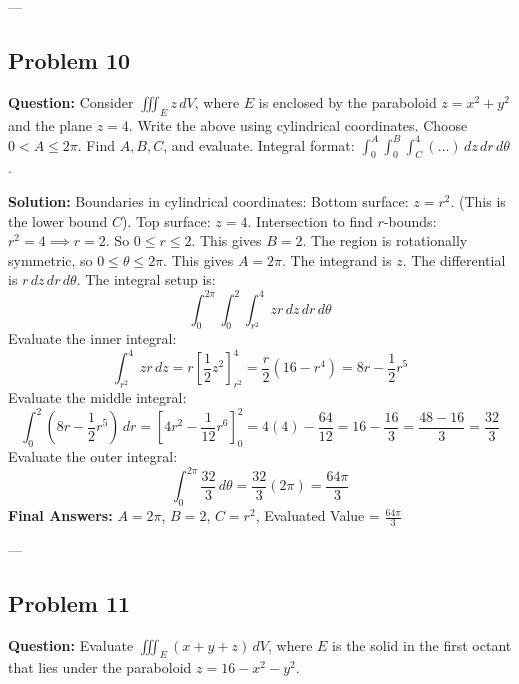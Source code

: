 \documentclass[11pt]{article}
\begin{document}
---

\subsection*{Problem 10}
\textbf{Question:} Consider $\iiint_E z \, dV$, where $E$ is enclosed by the paraboloid $z = x^2 + y^2$ and the plane $z = 4$. Write the above using cylindrical coordinates. Choose $0 < A \leq 2\pi$. Find $A, B, C$, and evaluate.
Integral format: $\int_0^A \int_0^B \int_C^4 (\dots) \, dz \, dr \, d\theta$.

\textbf{Solution:}
Boundaries in cylindrical coordinates:
Bottom surface: $z = r^2$. (This is the lower bound $C$).
Top surface: $z = 4$.
Intersection to find $r$-bounds: $r^2 = 4 \implies r = 2$. So $0 \leq r \leq 2$. This gives $B = 2$.
The region is rotationally symmetric, so $0 \leq \theta \leq 2\pi$. This gives $A = 2\pi$.
The integrand is $z$. The differential is $r \, dz \, dr \, d\theta$.
The integral setup is:
\[ \int_0^{2\pi} \int_0^2 \int_{r^2}^4 zr \, dz \, dr \, d\theta \]
Evaluate the inner integral:
\[ \int_{r^2}^4 zr \, dz = r \left[ \frac{1}{2}z^2 \right]_{r^2}^4 = \frac{r}{2}(16 - r^4) = 8r - \frac{1}{2}r^5 \]
Evaluate the middle integral:
\[ \int_0^2 \left( 8r - \frac{1}{2}r^5 \right) \, dr = \left[ 4r^2 - \frac{1}{12}r^6 \right]_0^2 = 4(4) - \frac{64}{12} = 16 - \frac{16}{3} = \frac{48 - 16}{3} = \frac{32}{3} \]
Evaluate the outer integral:
\[ \int_0^{2\pi} \frac{32}{3} \, d\theta = \frac{32}{3}(2\pi) = \frac{64\pi}{3} \]
\textbf{Final Answers:} 
$A = 2\pi$, $B = 2$, $C = r^2$, Evaluated Value = $\frac{64\pi}{3}$

---

\subsection*{Problem 11}
\textbf{Question:} Evaluate $\iiint_E (x + y + z) \, dV$, where $E$ is the solid in the first octant that lies under the paraboloid $z = 16 - x^2 - y^2$.
\end{document}
